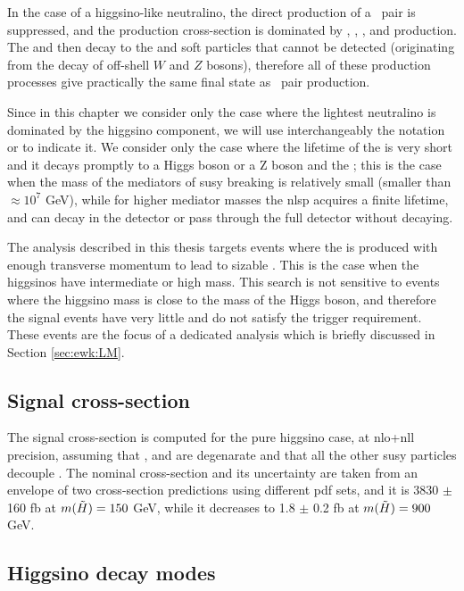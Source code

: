 In the case of a higgsino-like neutralino, the direct production of a \ninoone\ninoone\ pair is suppressed, and the production cross-section is dominated by 
\ninoone\ninotwo, \ninoone\chinoonepm, \ninotwo\chinoonepm, and \chinoonep\chinoonem production.
The \ninotwo and \chinoonepm then decay to the \ninoone and soft particles that cannot be detected (originating from the 
decay of off-shell $W$ and $Z$ bosons), therefore all of these production processes give practically the same final state as 
\ninoone\ninoone\  pair production. 

Since in this chapter we consider only the case where the lightest neutralino is dominated by the higgsino component,
we will use interchangeably the notation \ninoone or \hino to indicate it.  
We consider only the case where the lifetime of the \hino is very short and it decays promptly to a Higgs boson or a Z boson and the \gravino;
this is the case when the mass of the mediators of \gls{susy} breaking is relatively small (smaller than $\approx 10^7$ GeV), 
while for higher mediator masses the \gls{nlsp} acquires a finite lifetime, and can decay in the detector or pass
 through the full detector without decaying. 

The analysis described in this thesis targets events where the \gravino is produced with enough transverse momentum to lead to 
sizable \met. This is the case when the higgsinos have intermediate or high mass.
This search is not sensitive to events where the higgsino mass is close to the mass of the Higgs boson, and therefore 
the signal events have very little \met and do not satisfy the \met trigger requirement.
These events are the focus of a dedicated analysis which is briefly discussed in Section \ref{sec:ewk:LM}.


\subsection{Signal cross-section}

The signal cross-section is computed for the pure higgsino case, at \gls{nlo}+\gls{nll} precision, assuming that
\ninoone, \ninotwo and \chinoonepm are degenarate and that all the other \gls{susy} particles decouple \cite{Fuks:2012qx,Fuks:2013vua}.
The nominal cross-section and its uncertainty are taken from an envelope of two cross-section predictions using different \gls{pdf} sets, 
and it is 3830 $\pm$ 160 fb at $m(\tilde{H}) = 150$ GeV, while it decreases to 1.8 $\pm$ 0.2 fb at $m(\tilde{H}) = 900$ GeV. 

\subsection{Higgsino decay modes}

